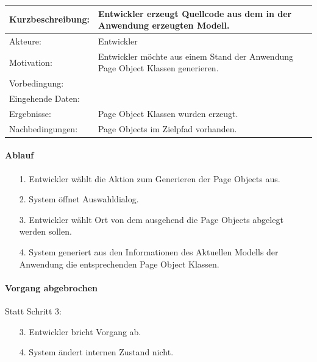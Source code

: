 \begin{tabular}[h]{|p{4cm}|p{}|}
\hline 
\rule[-1ex]{0pt}{2.5ex}Kurzbeschreibung: & 
Entwickler erzeugt Quellcode aus dem in der Anwendung erzeugten Modell. \\  
\hline 
\rule[-1ex]{0pt}{2.5ex}Akteure: & 
Entwickler \\ 
\hline 
\rule[-1ex]{0pt}{2.5ex}Motivation: & 
Entwickler möchte aus einem Stand der Anwendung Page Object Klassen generieren. \\ 
\hline 
\rule[-1ex]{0pt}{2.5ex}Vorbedingung: &  \\ 
\hline 
\rule[-1ex]{0pt}{2.5ex}Eingehende Daten: & \\ 
\hline 
\rule[-1ex]{0pt}{2.5ex}Ergebnisse: & Page Object Klassen wurden erzeugt. \\ 
\hline 
\rule[-1ex]{0pt}{2.5ex}Nachbedingungen: & Page Objects im Zielpfad vorhanden.  \\ 
\hline 
\end{tabular} 

\paragraph{Ablauf}

\begin{itemize}[itemsep=0pt]
\item[1.] Entwickler wählt die Aktion zum Generieren der Page Objects aus.
\item[2.] System öffnet Auswahldialog. 
\item[3.] Entwickler wählt Ort von dem ausgehend die Page Objects abgelegt werden sollen.
\item[4.] System generiert aus den Informationen des Aktuellen Modells der Anwendung die entsprechenden Page Object Klassen.

\end{itemize}

\paragraph{Vorgang abgebrochen}
Statt Schritt 3:
\begin{itemize}[itemsep=0pt]
\item[3.] Entwickler bricht Vorgang ab. 
\item[4.] System ändert internen Zustand nicht. 
\end{itemize}

\newpage

